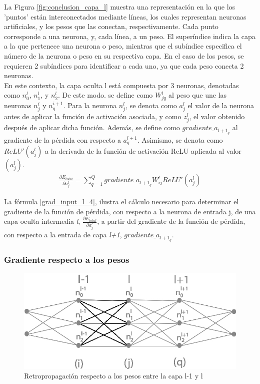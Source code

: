 La Figura \ref{fig:conclusion_capa_l} muestra una representación en la que los 'puntos' están interconectados mediante líneas, los cuales representan neuronas artificiales, y los pesos que las conectan, respectivamente. Cada punto corresponde a una neurona, y, cada línea, a un peso. El superíndice indica la capa a la que pertenece una neurona o peso, mientras que el subíndice especifica el número de la neurona o peso en su respectiva capa. En el caso de los pesos, se requieren 2 subíndices para identificar a cada uno, ya que cada peso conecta 2 neuronas. \\
En este contexto, la capa oculta l está compuesta por 3 neuronas, denotadas como $n^{l}_0$, $n^{l}_1$, y $n^{l}_2$. De este modo. se define como $W^{i}_{jq}$ al peso que une las neuronas $n^{i}_j$ y $n^{i+1}_q$. 
Para la neurona $n^l_j$, se denota como $a^l_j$ el valor de la neurona antes de aplicar la función de activación asociada, y como $z^l_j$, el valor obtenido después de aplicar dicha función. 
Además, se define como $gradiente\_a_{{l+1}_q}$ al gradiente de la pérdida con respecto a $a^{l+1}_q$. Asimismo, se denota como $ReLU'(a^l_j)$ a la derivada de la función de activación ReLU aplicada al valor $(a^l_j)$.\\

\begin{gather}
	\frac{\partial E_{total}}{\partial a^l_j} = \sum_{q=1}^Q  gradiente\_a_{{l+1}_q} W^l_{ij} ReLU'(a^l_j) \label{grad_input_l_4}
\end{gather}

La fórmula \ref{grad_input_l_4}, ilustra el cálculo necesario para determinar el gradiente de la función de pérdida, con respecto a la neurona de entrada j, de una capa oculta intermedia \textit{l}, $\frac{\partial E_{total}}{\partial a^l_j}$, a partir del gradiente de la función de pérdida, con respecto a la entrada de capa \textit{l+1}, $gradiente\_a_{{l+1}_q}$.


\subsubsection{Gradiente respecto a los pesos}

\begin{figure}[H]
	\centering
	\includegraphics[scale=0.35]{imagenes/conclusion_pesos.jpg}  
	\caption{Retropropagación respecto a los pesos entre la capa l-1 y l}
	\label{fig:conclusion_pesos}
\end{figure}

